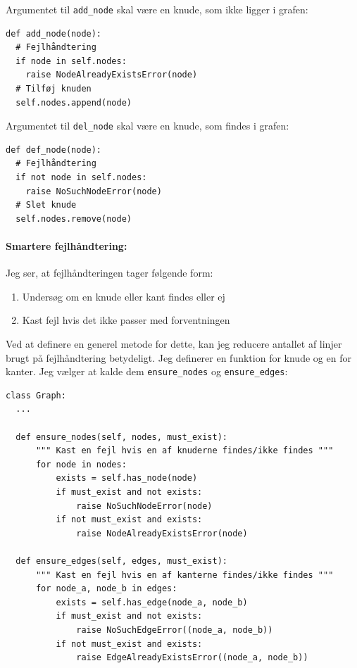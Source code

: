 \documentclass[10pt,a4paper,danish]{article}
\newcommand{\ct}{\texttt}
\begin{document}
Argumentet til \ct{add\_node} skal være en knude, som ikke ligger i
grafen:
{\small
\begin{verbatim}
def add_node(node):
  # Fejlhåndtering
  if node in self.nodes:
    raise NodeAlreadyExistsError(node)
  # Tilføj knuden
  self.nodes.append(node)
\end{verbatim}}

Argumentet til \ct{del\_node} skal være en knude, som findes i grafen:
{\small
\begin{verbatim}
def def_node(node):
  # Fejlhåndtering
  if not node in self.nodes:
    raise NoSuchNodeError(node)
  # Slet knude
  self.nodes.remove(node)
\end{verbatim}}

\paragraph{Smartere fejlhåndtering:}
Jeg ser, at fejlhåndteringen tager følgende form:
\begin{enumerate}
\item Undersøg om en knude eller kant findes eller ej
\item Kast fejl hvis det ikke passer med forventningen
\end{enumerate}

Ved at definere en generel metode for dette, kan jeg reducere antallet
af linjer brugt på fejlhåndtering betydeligt. Jeg definerer en
funktion for knude og en for kanter. Jeg vælger at kalde dem
\ct{ensure\_nodes} og \ct{ensure\_edges}:

\begin{samepage}
{\small
\begin{verbatim}
class Graph:
  ...

  def ensure_nodes(self, nodes, must_exist):
      """ Kast en fejl hvis en af knuderne findes/ikke findes """
      for node in nodes:
          exists = self.has_node(node)
          if must_exist and not exists:
              raise NoSuchNodeError(node)
          if not must_exist and exists:
              raise NodeAlreadyExistsError(node)

  def ensure_edges(self, edges, must_exist):
      """ Kast en fejl hvis en af kanterne findes/ikke findes """
      for node_a, node_b in edges:
          exists = self.has_edge(node_a, node_b)
          if must_exist and not exists:
              raise NoSuchEdgeError((node_a, node_b))
          if not must_exist and exists:
              raise EdgeAlreadyExistsError((node_a, node_b))
\end{verbatim}}
\end{samepage}
\end{document}
